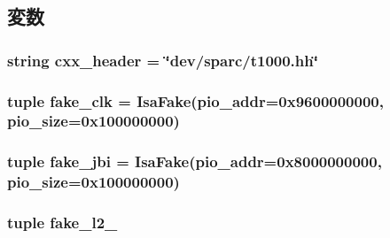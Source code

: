 \subsection{変数}
\hypertarget{classT1000_1_1T1000_a17da7064bc5c518791f0c891eff05fda}{
\subsubsection[{cxx\_\-header}]{\setlength{\rightskip}{0pt plus 5cm}string {\bf cxx\_\-header} = \char`\"{}dev/sparc/t1000.hh\char`\"{}}}
\label{classT1000_1_1T1000_a17da7064bc5c518791f0c891eff05fda}
\hypertarget{classT1000_1_1T1000_a751958bc3d33af34410da835f53d0276}{
\subsubsection[{fake\_\-clk}]{\setlength{\rightskip}{0pt plus 5cm}tuple {\bf fake\_\-clk} = {\bf IsaFake}(pio\_\-addr=0x9600000000, pio\_\-size=0x100000000)}}
\label{classT1000_1_1T1000_a751958bc3d33af34410da835f53d0276}
\hypertarget{classT1000_1_1T1000_a8c08b2b1e654aad4b0647b18ac56f4be}{
\subsubsection[{fake\_\-jbi}]{\setlength{\rightskip}{0pt plus 5cm}tuple {\bf fake\_\-jbi} = {\bf IsaFake}(pio\_\-addr=0x8000000000, pio\_\-size=0x100000000)}}
\label{classT1000_1_1T1000_a8c08b2b1e654aad4b0647b18ac56f4be}
\hypertarget{classT1000_1_1T1000_a385271574ece269aa9f1c5cb030eb30c}{
\subsubsection[{fake\_\-l2\_\-1}]{\setlength{\rightskip}{0pt plus 5cm}tuple {\bf fake\_\-l2\_}}}
